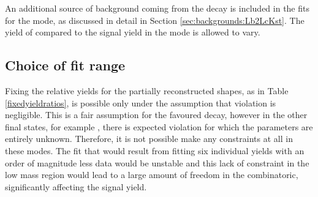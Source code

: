 \begin{table}[h]
\centering
{}
\caption{Fit results from the \kpipipi favoured mode for LL and DD candidates, corresponding to the fits in Figure \ref{massfitsk3pi}. The parameter $\beta$ is the combinatoric background slope, $f_0$ is the yield ratio between 010 and 101 helicity amplitudes, $\sigma$ is the floating width of the signal shape, and $N_{sig}$, $N_{comb}$ and $N_{dstkst}$ are the yields of signal, combinatoric background and partially reconstructed decays respectively}
\label{fitresultsk3pi}
\end{table}

An additional source of background coming from the decay  is included in the fits for the \decay{\Bm}{\D(\Kp\Km)\Kstarm} mode, as discussed in detail in Section \ref{sec:backgrounds:Lb2LcKst}. The yield of  compared to the signal yield in the \decay{\Bm}{\D(\Km\pip)\Kstarm} mode is allowed to vary.

\subsection{Choice of fit range}
\label{sec:massfit:range}	

Fixing the relative yields for the partially reconstructed shapes, as in Table \ref{fixedyieldratios}, is possible only under the assumption that \CP violation is negligible. This is a fair assumption for the favoured \kpi decay, however in the other \D final states, for example \pik, there is expected \CP violation for which the parameters are entirely unknown. Therefore, it is not possible make any constraints at all in these modes. The fit that would result from fitting six individual yields with an order of magnitude less data would be unstable and this lack of constraint in the low mass region would lead to a large amount of freedom in the combinatoric, significantly affecting the signal yield. 

